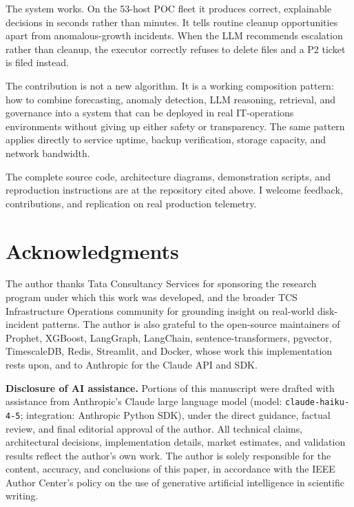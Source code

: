 \documentclass[conference]{IEEEtran}
\begin{document}
The system works. On the 53-host POC fleet it produces correct,
explainable decisions in seconds rather than minutes. It tells
routine cleanup opportunities apart from anomalous-growth incidents.
When the LLM recommends escalation rather than cleanup, the executor
correctly refuses to delete files and a P2 ticket is filed instead.

The contribution is not a new algorithm. It is a working composition
pattern: how to combine forecasting, anomaly detection, LLM
reasoning, retrieval, and governance into a system that can be
deployed in real IT-operations environments without giving up
either safety or transparency. The same pattern applies directly to
service uptime, backup verification, storage capacity, and network
bandwidth.

The complete source code, architecture diagrams, demonstration
scripts, and reproduction instructions are at the repository cited
above. I welcome feedback, contributions, and replication on real
production telemetry.

\section*{Acknowledgments}

The author thanks Tata Consultancy Services for sponsoring the
research program under which this work was developed, and the broader
TCS Infrastructure Operations community for grounding insight on
real-world disk-incident patterns. The author is also grateful to the
open-source maintainers of Prophet, XGBoost, LangGraph, LangChain,
sentence-transformers, pgvector, TimescaleDB, Redis, Streamlit, and
Docker, whose work this implementation rests upon, and to Anthropic
for the Claude API and SDK.

\textbf{Disclosure of AI assistance.} Portions of this manuscript
were drafted with assistance from Anthropic's Claude large language
model (model: \texttt{claude-haiku-4-5}; integration: Anthropic
Python SDK), under the direct guidance, factual review, and final
editorial approval of the author. All technical claims, architectural
decisions, implementation details, market estimates, and validation
results reflect the author's own work. The author is solely
responsible for the content, accuracy, and conclusions of this paper,
in accordance with the IEEE Author Center's policy on the use of
generative artificial intelligence in scientific writing.



\end{document}
